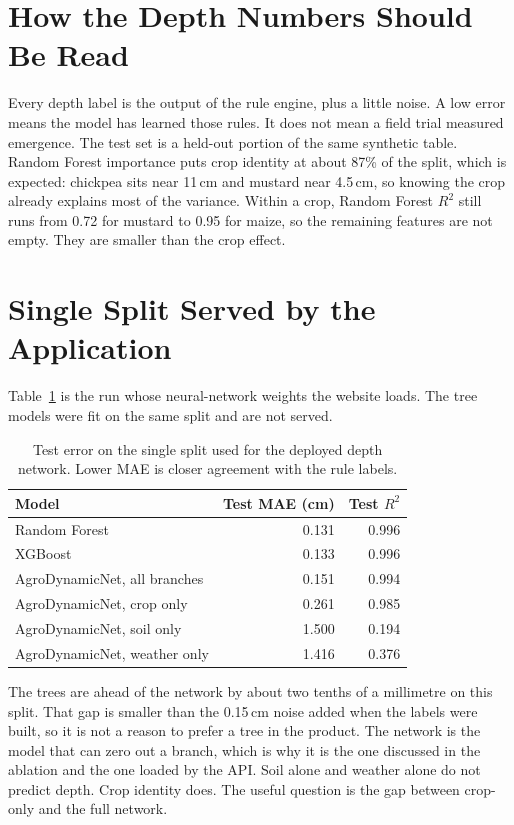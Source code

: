\label{ch:results}

\section{How the Depth Numbers Should Be Read}
Every depth label is the output of the rule engine, plus a little noise. A low error means the model has learned those rules. It does not mean a field trial measured emergence. The test set is a held-out portion of the same synthetic table. Random Forest importance puts crop identity at about 87\% of the split, which is expected: chickpea sits near 11\,cm and mustard near 4.5\,cm, so knowing the crop already explains most of the variance. Within a crop, Random Forest $R^{2}$ still runs from 0.72 for mustard to 0.95 for maize, so the remaining features are not empty. They are smaller than the crop effect.

\section{Single Split Served by the Application}
Table~\ref{tab:depth-one} is the run whose neural-network weights the website loads. The tree models were fit on the same split and are not served.

\begin{table}[H]
\centering
\caption{Test error on the single split used for the deployed depth network. Lower MAE is closer agreement with the rule labels.}
\label{tab:depth-one}
\begin{tabular}{lrr}
\toprule
\textbf{Model} & \textbf{Test MAE (cm)} & \textbf{Test $R^{2}$} \\
\midrule
Random Forest & 0.131 & 0.996 \\
XGBoost & 0.133 & 0.996 \\
AgroDynamicNet, all branches & 0.151 & 0.994 \\
AgroDynamicNet, crop only & 0.261 & 0.985 \\
AgroDynamicNet, soil only & 1.500 & 0.194 \\
AgroDynamicNet, weather only & 1.416 & 0.376 \\
\bottomrule
\end{tabular}
\end{table}

The trees are ahead of the network by about two tenths of a millimetre on this split. That gap is smaller than the 0.15\,cm noise added when the labels were built, so it is not a reason to prefer a tree in the product. The network is the model that can zero out a branch, which is why it is the one discussed in the ablation and the one loaded by the API. Soil alone and weather alone do not predict depth. Crop identity does. The useful question is the gap between crop-only and the full network.

